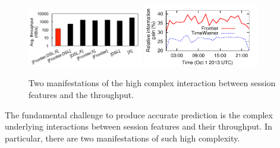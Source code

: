 \begin{figure}[t!]
\centering
\subfloat[The average throughput of sessions matching all and a subset of three features: $\mathit{ISP=}$~Frontier, $\mathit{Technology=}$~DSL and $\mathit{Target=}$~samknows1.lax9.level3.net (X). Time: 18:00-00:00 UTC, Oct 7, 2013]
{
        \includegraphics[width=0.45\textwidth]{figures/dda-high-dimensionality.pdf}
        \label{fig:high-dimensionality}
}
\hspace{0.5cm}
\subfloat[The relative information gain of $\mathit{Target}$ in two ISPs over time.]
{
        \includegraphics[width=0.45\textwidth]{figures/dda-diversity-fcc.pdf}
        \label{fig:diversity}
}
\caption{Two manifestations of the high complex interaction between session features and the throughput.}
\label{fig:challenges}
\end{figure}



 The fundamental challenge to produce accurate prediction is the complex underlying interactions between session features and their throughput.
In particular, there are two manifestations of such high complexity.

